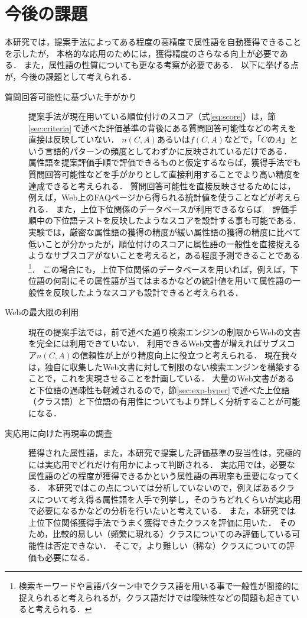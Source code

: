 \section{今後の課題}
\label{sec:discussion}
本研究では，提案手法によってある程度の高精度で属性語を自動獲得できることを示したが，
本格的な応用のためには，獲得精度のさらなる向上が必要である．
また，属性語の性質についても更なる考察が必要である．
以下に挙げる点が，今後の課題として考えられる．
\begin{description}
\item[質問回答可能性に基づいた手がかり] 
提案手法が現在用いている順位付けのスコア（式\ref{eq:score}）は，節\ref{sec:criteria}\,で述べた評価基準の背後にある質問回答可能性などの考えを直接は反映していない．
$n(C,A)$あるいは$f(C,A)$などで，「$C$の$A$」という言語的パターンの頻度としてわずかに反映されているだけである．
属性語を提案評価手順で評価できるものと仮定するならば，獲得手法でも質問回答可能性などを手がかりとして直接利用することでより高い精度を達成できると考えられる．
質問回答可能性を直接反映させるためには，例えば，Web上のFAQページから得られる統計値を使うことなどが考えられる．
また，上位下位関係のデータベースが利用できるならば,　評価手順中の下位語テストを反映したようなスコアを設計する事も可能である．
実験では，厳密な属性語の獲得の精度が緩い属性語の獲得の精度に比べて低いことが分かったが，順位付けのスコアに属性語の一般性を直接捉えるようなサブスコアがないことを考えると，ある程度予測できることである\footnote{検索キーワードや言語パターン中でクラス語を用いる事で一般性が間接的に捉えられると考えられるが，クラス語だけでは曖昧性などの問題も起きていると考えられる．}．
この場合にも，上位下位関係のデータベースを用いれば，例えば，下位語の何割にその属性語が当てはまるかなどの統計値を用いて属性語の一般性を反映したようなスコアも設計できると考えられる．

\item[Webの最大限の利用] 
現在の提案手法では，前で述べた通り検索エンジンの制限からWebの文書を完全には利用できていない．
利用できるWeb文書が増えればサブスコア$n(C,A)$の信頼性が上がり精度向上に役立つと考えられる．
現在我々は，独自に収集したWeb文書に対して制限のない検索エンジンを構築することで，これを実現させることを計画している．
大量のWeb文書があると下位語の過疎性も軽減されるので，節\ref{sec:exp-hyper}\,で述べた上位語（クラス語）と下位語の有用性についてもより詳しく分析することが可能になる．


\item[実応用に向けた再現率の調査]
獲得された属性語，また，本研究で提案した評価基準の妥当性は，究極的には実応用でどれだけ有用かによって判断される．
実応用では，必要な属性語のどの程度が獲得できるかという属性語の再現率も重要になってくる．
本研究ではこの点については分析していないので，例えばあるクラスについて考え得る属性語を人手で列挙し，そのうちどれくらいが実応用で必要になるかなどの分析を行いたいと考えている．
また，本研究では上位下位関係獲得手法でうまく獲得できたクラスを評価に用いた． 
そのため，比較的易しい（頻繁に現れる）クラスについてのみ評価している可能性は否定できない．
そこで，より難しい（稀な）クラスについての評価も必要になる．


\end{description}
